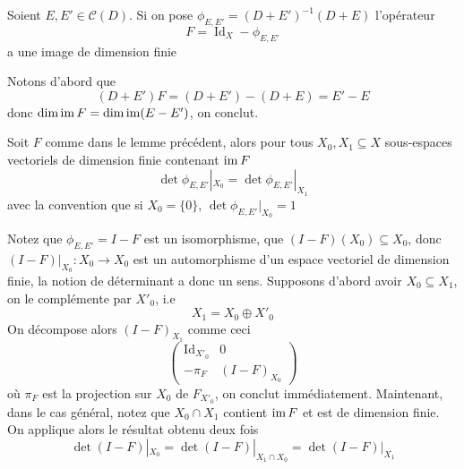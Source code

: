 \documentclass[memoire.tex]{subfiles}
\begin{document}
\begin{lemme}
    Soient $E,E'\in \mathcal{C}(D)$. Si on pose $\phi_{E,E'}=(D+E')^{-1}(D+E)$
    l'opérateur
    \begin{equation*}
        F= \operatorname{Id}_X -\phi_{E,E'}
    \end{equation*}
    a une image de dimension finie
\end{lemme}

\begin{preuve}
   Notons d'abord que 
   \begin{equation*}
        (D+E')F= (D+E')-(D+E)=E'-E
   \end{equation*}
   donc $\dim\operatorname{im} F=\dim\operatorname{im} (E-E')$, on conclut.
\end{preuve}




\begin{lemme}
    Soit $F$ comme dans le lemme précédent, alors pour tous $X_0,X_1\subseteq  X$ sous-espaces vectoriels de dimension 
    finie contenant $\operatorname{im} F$
    \begin{equation*}
        \det \phi_{E,E'}|_{X_0}= \det \phi_{E,E'}|_{X_1}
    \end{equation*}
    avec la convention que si $X_0=\{0\}$,  $\det \phi_{E,E'}|_{X_0}=1$
\end{lemme}
\begin{preuve}
    Notez que $\phi_{E,E'} =I-F$ est un isomorphisme, que $(I-F)(X_0)\subseteq X_0$, donc $(I-F)|_{X_0}: X_0\rightarrow X_0$ est un automorphisme d'un espace vectoriel de dimension finie, la notion de déterminant a donc un sens. Supposons d'abord avoir $X_0\subseteq X_1$, on le complémente par $X'_0$, i.e 
    \begin{equation*}
        X_1=X_0\oplus X'_0
    \end{equation*}
    On décompose alors $(I-F)_{X_1}$ comme ceci
    \begin{equation*}
            \begin{pmatrix}
        \operatorname{Id}_{X'_0} & 0 \\
        -\pi_F & (I-F)_{X_0} 
        \end{pmatrix}
    \end{equation*}
où  $\pi_F$ est la projection sur $X_0$ de  $F_{X'_0}$, on conclut immédiatement. Maintenant, dans le cas général, notez que $X_0\cap X_1$ contient $\operatorname{im} F$ et est de dimension finie. On applique alors le résultat obtenu deux fois 
\begin{equation*}
    \det (I-F)|_{X_0}= \det (I-F)|_{X_1\cap X_0}=\det (I-F)|_{X_1}
\end{equation*}
\end{preuve}
\end{document}
